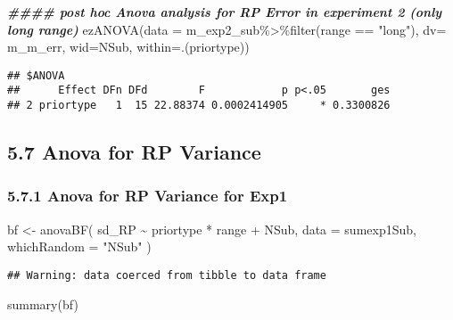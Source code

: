 \documentclass[
]{article}
\newenvironment{Shaded}{\begin{snugshade}}{\end{snugshade}}
\newcommand{\AttributeTok}[1]{\textcolor[rgb]{0.77,0.63,0.00}{#1}}
\newcommand{\DocumentationTok}[1]{\textcolor[rgb]{0.56,0.35,0.01}{\textbf{\textit{#1}}}}
\newcommand{\FunctionTok}[1]{\textcolor[rgb]{0.00,0.00,0.00}{#1}}
\newcommand{\NormalTok}[1]{#1}
\newcommand{\OtherTok}[1]{\textcolor[rgb]{0.56,0.35,0.01}{#1}}
\newcommand{\SpecialCharTok}[1]{\textcolor[rgb]{0.00,0.00,0.00}{#1}}
\newcommand{\StringTok}[1]{\textcolor[rgb]{0.31,0.60,0.02}{#1}}
\begin{document}
\begin{Shaded}
\begin{Highlighting}[]
\DocumentationTok{\#\#\#\# post hoc Anova analysis  for RP Error in experiment 2 (only long range)}
 \FunctionTok{ezANOVA}\NormalTok{(}\AttributeTok{data =}\NormalTok{ m\_exp2\_sub}\SpecialCharTok{\%\textgreater{}\%}\FunctionTok{filter}\NormalTok{(range }\SpecialCharTok{==} \StringTok{"long"}\NormalTok{), }\AttributeTok{dv=}\NormalTok{ m\_m\_err, }\AttributeTok{wid=}\NormalTok{NSub, }\AttributeTok{within=}\NormalTok{.(priortype))}
\end{Highlighting}
\end{Shaded}

\begin{verbatim}
## $ANOVA
##      Effect DFn DFd        F            p p<.05       ges
## 2 priortype   1  15 22.88374 0.0002414905     * 0.3300826
\end{verbatim}

\hypertarget{anova-for-rp-variance}{%
\subsection{5.7 Anova for RP Variance}\label{anova-for-rp-variance}}

\hypertarget{anova-for-rp-variance-for-exp1}{%
\subsubsection{5.7.1 Anova for RP Variance for
Exp1}\label{anova-for-rp-variance-for-exp1}}

\begin{Shaded}
\begin{Highlighting}[]
\NormalTok{bf }\OtherTok{\textless{}{-}} \FunctionTok{anovaBF}\NormalTok{( sd\_RP }\SpecialCharTok{\textasciitilde{}}\NormalTok{ priortype }\SpecialCharTok{*}\NormalTok{ range }\SpecialCharTok{+}\NormalTok{ NSub, }\AttributeTok{data =}\NormalTok{ sumexp1Sub, }\AttributeTok{whichRandom =} \StringTok{"NSub"}\NormalTok{ ) }
\end{Highlighting}
\end{Shaded}

\begin{verbatim}
## Warning: data coerced from tibble to data frame
\end{verbatim}

\begin{Shaded}
\begin{Highlighting}[]
\FunctionTok{summary}\NormalTok{(bf)}
\end{Highlighting}
\end{Shaded}
\end{document}
